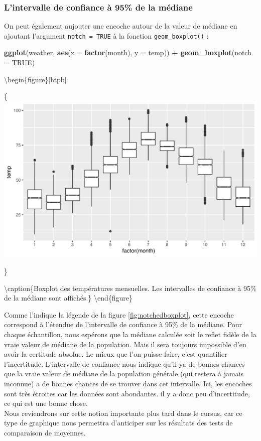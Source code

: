 \documentclass[a4paperpaper,]{article}
\newenvironment{Shaded}{\begin{snugshade}}{\end{snugshade}}
\newcommand{\KeywordTok}[1]{\textcolor[rgb]{0.13,0.29,0.53}{\textbf{#1}}}
\newcommand{\DataTypeTok}[1]{\textcolor[rgb]{0.13,0.29,0.53}{#1}}
\newcommand{\StringTok}[1]{\textcolor[rgb]{0.31,0.60,0.02}{#1}}
\newcommand{\OtherTok}[1]{\textcolor[rgb]{0.56,0.35,0.01}{#1}}
\newcommand{\OperatorTok}[1]{\textcolor[rgb]{0.81,0.36,0.00}{\textbf{#1}}}
\newcommand{\NormalTok}[1]{#1}
\theoremstyle{definition}
\theoremstyle{definition}
\theoremstyle{definition}
\theoremstyle{remark}
\begin{document}
\subsubsection{L'intervalle de confiance à 95\% de la
médiane}\label{lintervalle-de-confiance-a-95-de-la-mediane}

On peut également aujouter une encoche autour de la valeur de médiane en
ajoutant l'argument \texttt{notch\ =\ TRUE} à la fonction
\texttt{geom\_boxplot()} :

\begin{Shaded}
\begin{Highlighting}[]
\KeywordTok{ggplot}\NormalTok{(weather, }\KeywordTok{aes}\NormalTok{(}\DataTypeTok{x =} \KeywordTok{factor}\NormalTok{(month), }\DataTypeTok{y =}\NormalTok{ temp)) }\OperatorTok{+}
\StringTok{  }\KeywordTok{geom_boxplot}\NormalTok{(}\DataTypeTok{notch =} \OtherTok{TRUE}\NormalTok{)}
\end{Highlighting}
\end{Shaded}

\textbackslash{}begin\{figure\}{[}htpb{]}

\{\centering \includegraphics[width=0.9\linewidth]{figure/notchedboxplot-1}

\}

\textbackslash{}caption\{Boxplot des températures mensuelles. Les
intervalles de confiance à 95\% de la médiane sont
affichés.\}\label{fig:notchedboxplot} \textbackslash{}end\{figure\}

Comme l'indique la légende de la figure \ref{fig:notchedboxplot}, cette
encoche correspond à l'étendue de l'intervalle de confiance à 95\% de la
médiane. Pour chaque échantillon, nous espérons que la médiane calculée
soit le reflet fidèle de la vraie valeur de médiane de la population.
Mais il sera toujours impossible d'en avoir la certitude absolue. Le
mieux que l'on puisse faire, c'est quantifier l'incertitude.
L'intervalle de confiance nous indique qu'il ya de bonnes chances que la
vraie valeur de médiane de la population générale (qui restera à jamais
inconnue) a de bonnes chances de se trouver dans cet intervalle. Ici,
les encoches sont très étroites car les données sont abondantes. il y a
donc peu d'incertitude, ce qui est une bonne chose.\\
Nous reviendrons sur cette notion importante plus tard dans le cursus,
car ce type de graphique nous permettra d'anticiper sur les résultats
des tests de comparaison de moyennes.
\end{document}
